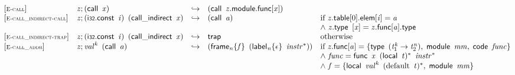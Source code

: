 $$
\begin{array}{@{}l@{}lcl@{}l@{}}
{[\textsc{\scriptsize E{-}call}]} \quad & {\mathit{z}} ; (\mathsf{call}~\,{\mathit{x}}) &\hookrightarrow& (\mathsf{call}~\,{\mathit{z}}.\mathsf{module}.\mathsf{func}{}[{\mathit{x}}]) &  \\
{[\textsc{\scriptsize E{-}call\_indirect{-}call}]} \quad & {\mathit{z}} ; (\mathsf{i{\scriptstyle32}}.\mathsf{const}~\,{\mathit{i}})~\,(\mathsf{call\_indirect}~\,{\mathit{x}}) &\hookrightarrow& (\mathsf{call}~\,{\mathit{a}}) &\quad
  \mbox{if}~{{\mathit{z}}.\mathsf{table}}{{}[0]}.\mathsf{elem}{}[{\mathit{i}}] = {\mathit{a}} \\
 &&&&\quad {\land}~{\mathit{z}}.\mathsf{type}~\,{}[{\mathit{x}}] = {\mathit{z}}.\mathsf{func}{}[{\mathit{a}}].\mathsf{type} \\
{[\textsc{\scriptsize E{-}call\_indirect{-}trap}]} \quad & {\mathit{z}} ; (\mathsf{i{\scriptstyle32}}.\mathsf{const}~\,{\mathit{i}})~\,(\mathsf{call\_indirect}~\,{\mathit{x}}) &\hookrightarrow& \mathsf{trap} &\quad
  \mbox{otherwise} \\
{[\textsc{\scriptsize E{-}call\_addr}]} \quad & {\mathit{z}} ; {{\mathit{val}}^{{\mathit{k}}}}~\,(\mathsf{call}~\,{\mathit{a}}) &\hookrightarrow& ({{\mathsf{frame}}_{{\mathit{n}}}}{\{{\mathit{f}}\}}~\,({{\mathsf{label}}_{{\mathit{n}}}}{\{\epsilon\}}~\,{{\mathit{instr}}^\ast})) &\quad
  \mbox{if}~{\mathit{z}}.\mathsf{func}{}[{\mathit{a}}] = \{ \begin{array}[t]{@{}l@{}}
\mathsf{type}~\,({{\mathit{t}}_{{1}}^{{\mathit{k}}}} \rightarrow {{\mathit{t}}_{{2}}^{{\mathit{n}}}}),\; \mathsf{module}~\,{\mathit{mm}},\; \mathsf{code}~\,{\mathit{func}} \}\end{array} \\
 &&&&\quad {\land}~{\mathit{func}} = \mathsf{func}~\,{\mathit{x}}~\,{(\mathsf{local}~\,{\mathit{t}})^\ast}~\,{{\mathit{instr}}^\ast} \\
 &&&&\quad {\land}~{\mathit{f}} = \{ \begin{array}[t]{@{}l@{}}
\mathsf{local}~\,{{\mathit{val}}^{{\mathit{k}}}}~\,{({\mathrm{default}}~\,{\mathit{t}})^\ast},\; \mathsf{module}~\,{\mathit{mm}} \}\end{array} \\
\end{array}
$$

\vspace{1ex}

